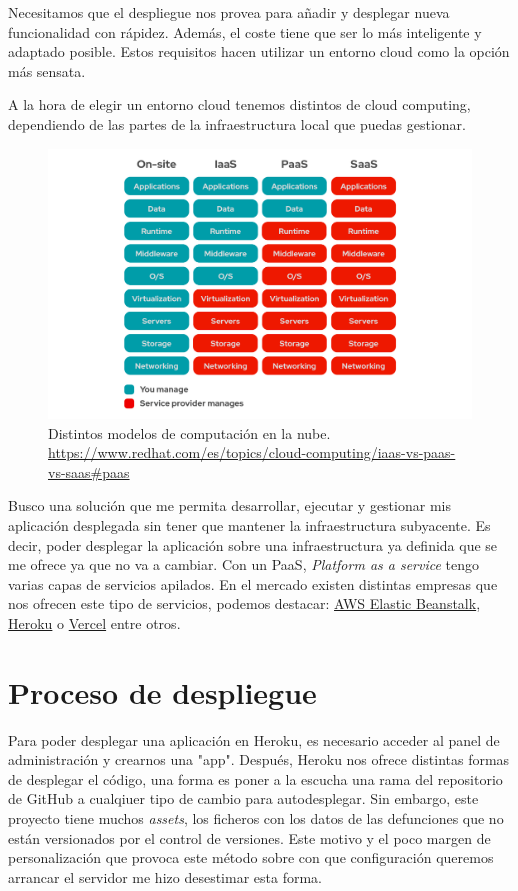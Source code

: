 Necesitamos que el despliegue nos provea para añadir y desplegar nueva funcionalidad con rápidez. Además, el coste tiene que ser lo más inteligente y adaptado posible. Estos requisitos hacen utilizar un entorno cloud como la opción más sensata.

A la hora de elegir un entorno cloud tenemos distintos de cloud computing, dependiendo de las partes de la infraestructura local que puedas gestionar.

\FloatBarrier
\begin{figure}[]
	\centering	
	\includegraphics[scale=0.5]{doc/logos/imgs/iaas-paas.png}
	\caption{ Distintos modelos de computación en la nube. \href{https://www.redhat.com/es/topics/cloud-computing/iaas-vs-paas-vs-saas#paas}{https://www.redhat.com/es/topics/cloud-computing/iaas-vs-paas-vs-saas#paas}}
    \label{fig:tipos-de-cc}
\end{figure}
\FloatBarrier

Busco una solución que me permita desarrollar, ejecutar y gestionar mis aplicación desplegada sin tener que mantener la infraestructura subyacente. Es decir, poder desplegar la aplicación sobre una infraestructura ya definida que se me ofrece ya que no va a cambiar. Con un PaaS, \textit{Platform as a service} tengo varias capas de servicios apilados.
En el mercado existen distintas empresas que nos ofrecen este tipo de servicios, podemos destacar: \href{https://aws.amazon.com/es/elasticbeanstalk/}{AWS Elastic Beanstalk}, \href{https://dashboard.heroku.com/login}{Heroku} o \href{https://vercel.com/}{Vercel} entre otros.

\section{Proceso de despliegue}
Para poder desplegar una aplicación en Heroku, es necesario acceder al panel de 
administración y crearnos una "app". Después, Heroku nos ofrece distintas formas de 
desplegar el código, una forma es poner a la escucha una rama del repositorio de GitHub a cualqiuer tipo de cambio para autodesplegar. Sin embargo, este proyecto tiene muchos
\textit{assets}, los ficheros con los datos de las defunciones que no están versionados por el control de versiones. Este motivo y el poco margen de personalización que provoca este método sobre con que configuración queremos arrancar el servidor me hizo desestimar esta forma.

